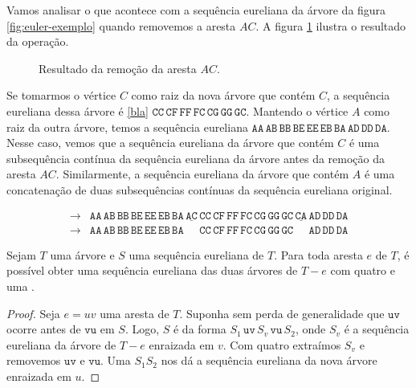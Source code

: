 Vamos analisar o que acontece com a sequência eureliana da árvore da figura \ref{fig:euler-exemplo} quando removemos a aresta $AC$. A figura \ref{fig:euler-exemplo-remove-ac} ilustra o resultado da operação.

\begin{figure}[H]
    \caption{Resultado da remoção da aresta $AC$.}
    \label{fig:euler-exemplo-remove-ac}
        \centering
\end{figure}

Se tomarmos o vértice $C$ como raiz da nova árvore que contém $C$, a sequência eureliana dessa árvore é \eqref{bla} $\mathtt{CC}\,\mathtt{CF}\,\mathtt{FF}\,\mathtt{FC}\,\mathtt{CG}\,\mathtt{GG}\,\mathtt{GC}$. Mantendo o vértice $A$ como raiz da outra árvore, temos a sequência eureliana $\mathtt{AA\,AB\,BB\,BE\,EE\,EB\,BA\,AD\,DD\,DA}$. Nesse caso, vemos que a sequência eureliana da árvore que contém $C$ é uma subsequência contínua da sequência eureliana da árvore antes da remoção da aresta $AC$. Similarmente, a sequência eureliana da árvore que contém $A$ é uma concatenação de duas subsequências contínuas da sequência eureliana original.

\begin{align}
 \rightarrow & \mathtt{AA\,AB\,BB\,BE\,EE\,EB\,BA\,\underline{AC}\,CC\,CF\,FF\,FC\,CG\,GG\,GC\,\underline{CA}\,AD\,DD\,DA} \label{bla}\\
\rightarrow & \mathtt{AA\,AB\,BB\,BE\,EE\,EB\,BA\,\phantom{AC\,}CC\,CF\,FF\,FC\,CG\,GG\,GC\,\phantom{CA\,}AD\,DD\,DA} \nonumber
\end{align}


\begin{prop}
Sejam $T$ uma árvore e $S$ uma sequência eureliana de $T$. Para toda aresta $e$ de $T$, é possível obter uma sequência eureliana das duas árvores de $T - e$ com quatro \splits e uma \concatenation.
\end{prop}
\begin{proof}
Seja $e = uv$ uma aresta de $T$. Suponha sem perda de generalidade que $\mathtt{uv}$ ocorre antes de $\mathtt{vu}$ em $S$. Logo, $S$ é da forma $S_1\,\mathtt{uv}\,S_v\,\mathtt{vu}\,S_2$, onde $S_v$ é a sequência eureliana da árvore de $T-e$ enraizada em $v$. Com quatro \splits extraímos $S_v$ e removemos $\mathtt{uv}$ e $\mathtt{vu}$. Uma \concatenation $S_1S_2$ nos dá a sequência eureliana da nova árvore enraizada em $u$.
\end{proof}

